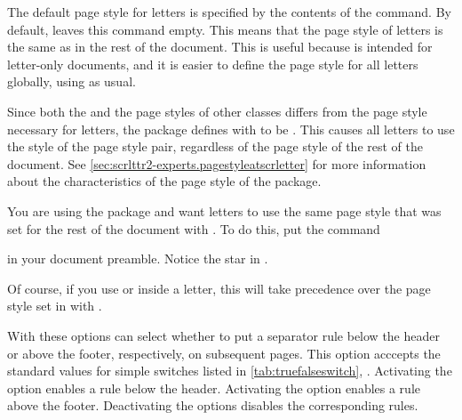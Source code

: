 \begin{Declaration}
\end{Declaration}
The default page
style for letters is specified by the contents of the 
command. By default,
 leaves this command empty. This
means that the page style of letters is the same as in the rest of the
document. This is useful because  is intended for letter-only
documents, and it is easier to define the page style for all letters globally,
using  as usual.

Since both the  and the
 page styles of other classes differs
from the page style necessary for letters, the
 package
defines  with to be
%
. This causes all
letters to use the
\hyperref[desc:\LabelBase.pagestyle.plain.letter]{} style of
the  page style
pair, regardless of the page style of the rest of the document. See
\autoref{sec:scrlttr2-experts.pagestyleatscrletter} for more information about
the characteristics of the page style of the  package.
\begin{Example}
  You are using the  package and want letters to use the
  same page style that was set for the rest of the document with
  . To do this, put the command
\begin{lstcode}
  \renewcommand*{\letterpagestyle}{}
\end{lstcode}
  in your document preamble. Notice the star in .
\end{Example}
Of course, if you use  or
 inside a letter, this will take
precedence over the page style set in  with
.%
\EndIndexGroup


\begin{Declaration}
\end{Declaration}
With these options  can select whether to put
a separator rule below the header
or above the footer, respectively, on subsequent pages. This option acccepts
the standard values for simple switches listed in
\autoref{tab:truefalseswitch}, .
Activating the 
option enables a rule below the header.
Activating the 
option enables a rule above the footer. Deactivating the options disables the
corresponding rules.

